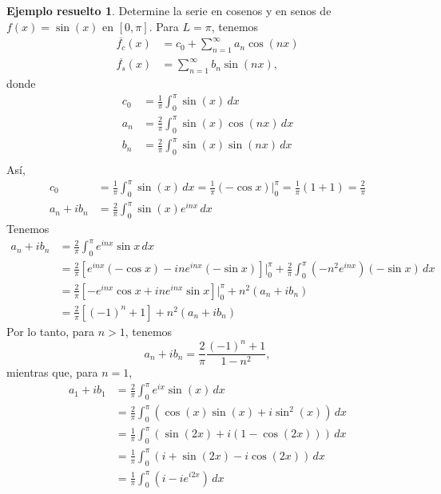 \documentclass[11pt,letterpaper,draft]{report}
\theoremstyle{plain}
\theoremstyle{definition}
\newtheorem{solved}[theorem]{Ejemplo resuelto}
\theoremstyle{remark}
\newcommand\<{\langle}
\renewcommand\>{\rangle}
\begin{document}
\begin{solved}
  Determine la serie en cosenos y en senos de $f(x)=\sin(x)$ en
  $[0,\pi]$.
  Para $L=\pi$, tenemos
  \begin{align*}
    \overline{f_c}(x)
    &=
    c_0
    +
    \sum_{n=1}^{\infty}a_n\cos(nx) \\
    \overline{f_s}(x)
    &= \sum_{n=1}^{\infty}b_n\sin(nx),
  \end{align*}
  donde
  \begin{align*}
    c_0
    &= \frac{1}{\pi}\int_{0}^{\pi}\sin(x)\,dx \\
    a_n
    &= \frac{2}{\pi}\int_{0}^{\pi}\sin(x)\cos(n x)\,dx \\
    b_n
    &= \frac{2}{\pi}\int_{0}^{\pi}\sin(x)\sin(n x)\,dx \\
  \end{align*}
  Así,
  \begin{align*}
    c_0
    &=
    \frac{1}{\pi}\int_{0}^{\pi}\sin(x)\,dx
    =\frac{1}{\pi}(-\cos x)\Big|_{0}^{\pi}
    =\frac{1}{\pi}(1+1)
    =\frac{2}{\pi} \\
    a_n+ib_n
    &= \frac{2}{\pi}\int_{0}^{\pi}\sin(x)e^{inx}\,dx
  \end{align*}
  Tenemos
  \begin{align*}
    a_n+ib_n
    &= \frac{2}{\pi}\int_{0}^{\pi}e^{inx}\sin x \,dx \\
    &= \frac{2}{\pi} \left[
      e^{inx}(-\cos x)
      -ine^{inx}(-\sin x)
    \right]\Big|_{0}^{\pi}
    +\frac{2}{\pi}\int_{0}^{\pi}(-n^{2}e^{inx})(-\sin x)\,dx \\
    &= \frac{2}{\pi} \left[
      -e^{inx}\cos x
      +ine^{inx}\sin x
    \right]\Big|_{0}^{\pi}
    +n^{2}(a_n+ib_n) \\
    &= \frac{2}{\pi} \left[
      (-1)^{n}
      +1
    \right]
    +n^{2}(a_n+ib_n)
  \end{align*}
  Por lo tanto, para $n>1$, tenemos
  \[
    a_n+ib_n
    =
    \frac{2}{\pi}\frac{(-1)^{n}+1}{1-n^{2}}
  ,\]
  mientras que, para $n=1$,
  \begin{align*}
    a_1+ib_1
    &=\frac{2}{\pi}\int_{0}^{\pi}e^{ix}\sin(x)\,dx \\
    &=\frac{2}{\pi}\int_{0}^{\pi}(\cos(x)\sin(x)+i\sin^{2}(x))\,dx \\
    &=\frac{1}{\pi}\int_{0}^{\pi}(\sin(2x)+i(1-\cos(2x)))\,dx \\
    &=\frac{1}{\pi}\int_{0}^{\pi}(i+\sin(2x)-i\cos(2x))\,dx \\
    &=\frac{1}{\pi}\int_{0}^{\pi}(i-ie^{i2x})\,dx \\

\end{align*}
\end{solved}
\end{document}

